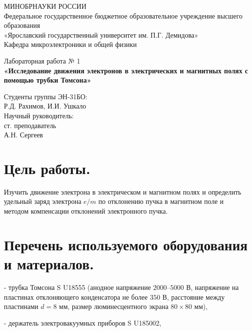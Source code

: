 \documentclass[12pt, a4paper]{article}
\begin{document}
	\onehalfspacing
	\thispagestyle{fancy}
	
	\begin{center}
		МИНОБРНАУКИ РОССИИ\\
		Федеральное государственное бюджетное образовательное учреждение высшего образования\\
		«Ярославский государственный университет им. П.Г. Демидова»\\[3mm]
		Кафедра микроэлектроники и общей физики
	\end{center}
	
	\vspace{55mm}
	
	\begin{center}
		Лабораторная работа № 1\\[3mm]
		\textbf{«Исследование движения электронов в электрических и магнитных полях с помощью трубки Томсона»}
	\end{center}
	
	\vspace{20mm}
	
	\begin{flushright}
		Студенты группы ЭН-31БО:\\
		Р.Д. Рахимов, И.И. Ушкало\\[5mm]
		Научный руководитель:\\
		ст. преподаватель\\
		А.Н. Сергеев
	\end{flushright}
	
	\newpage
	
	\section{Цель работы.}
	Изучить движение электрона в электрическом и магнитном полях и определить удельный заряд электрона $e/m$ по отклонению пучка в магнитном поле и методом компенсации отклонений электронного пучка.
	
	\section{Перечень используемого оборудования и материалов.}
	- трубка Томсона S U18555 (анодное напряжение $2000$--$5000$ В, напряжение на пластинах отклоняющего конденсатора не более $350$ В, расстояние между пластинами $d = 8$ мм, размер люминесцентного экрана $80 \times 80$ мм),
	
	- держатель электровакуумных приборов S U185002,
	
\end{document}
